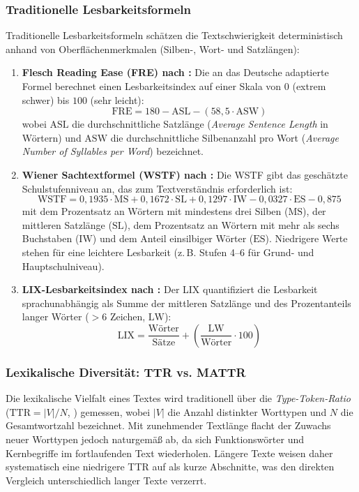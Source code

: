 \subsubsection{Traditionelle Lesbarkeitsformeln}
Traditionelle Lesbarkeitsformeln schätzen die Textschwierigkeit deterministisch anhand von Oberflächenmerkmalen (Silben-, Wort- und Satzlängen):
\begin{enumerate}
    \item \textbf{Flesch Reading Ease (FRE) nach \citet{amstad1978verstaendlich}:} Die an das Deutsche adaptierte Formel berechnet einen Lesbarkeitsindex auf einer Skala von $0$ (extrem schwer) bis $100$ (sehr leicht):
    \begin{equation}
        \text{FRE} = 180 - \text{ASL} - (58{,}5 \cdot \text{ASW})
    \end{equation}
    wobei $\text{ASL}$ die durchschnittliche Satzlänge (\textit{Average Sentence Length} in Wörtern) und $\text{ASW}$ die durchschnittliche Silbenanzahl pro Wort (\textit{Average Number of Syllables per Word}) bezeichnet.
    \item \textbf{Wiener Sachtextformel (WSTF) nach \citet{bamberger1984lesen}:} Die WSTF gibt das geschätzte Schulstufenniveau an, das zum Textverständnis erforderlich ist:
    \begin{equation}
        \text{WSTF} = 0{,}1935 \cdot \text{MS} + 0{,}1672 \cdot \text{SL} + 0{,}1297 \cdot \text{IW} - 0{,}0327 \cdot \text{ES} - 0{,}875
    \end{equation}
    mit dem Prozentsatz an Wörtern mit mindestens drei Silben ($\text{MS}$), der mittleren Satzlänge ($\text{SL}$), dem Prozentsatz an Wörtern mit mehr als sechs Buchstaben ($\text{IW}$) und dem Anteil einsilbiger Wörter ($\text{ES}$). Niedrigere Werte stehen für eine leichtere Lesbarkeit (z.\,B. Stufen 4--6 für Grund- und Hauptschulniveau).
    \item \textbf{LIX-Lesbarkeitsindex nach \citet{bjornsson1968readability}:} Der LIX quantifiziert die Lesbarkeit sprachunabhängig als Summe der mittleren Satzlänge und des Prozentanteils langer Wörter ($> 6$ Zeichen, $\text{LW}$):
    \begin{equation}
        \text{LIX} = \frac{\text{Wörter}}{\text{Sätze}} + \left( \frac{\text{LW}}{\text{Wörter}} \cdot 100 \right)
    \end{equation}
\end{enumerate}

\subsubsection{Lexikalische Diversität: TTR vs. MATTR}
Die lexikalische Vielfalt eines Textes wird traditionell über die \textit{Type-Token-Ratio} ($\text{TTR} = |V| / N$, \citealp{chotlos1944studies, templin1957certain}) gemessen, wobei $|V|$ die Anzahl distinkter Worttypen und $N$ die Gesamtwortzahl bezeichnet. Mit zunehmender Textlänge flacht der Zuwachs neuer Worttypen jedoch naturgemäß ab, da sich Funktionswörter und Kernbegriffe im fortlaufenden Text wiederholen. Längere Texte weisen daher systematisch eine niedrigere TTR auf als kurze Abschnitte, was den direkten Vergleich unterschiedlich langer Texte verzerrt.

